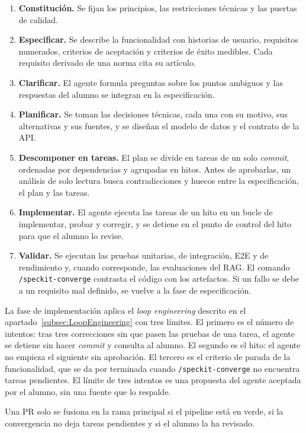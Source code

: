\begin{enumerate}
	\item \textbf{Constitución.} Se fijan los principios, las restricciones técnicas y las puertas de calidad.
	\item \textbf{Especificar.} Se describe la funcionalidad con historias de usuario, requisitos numerados, criterios de aceptación y criterios de éxito medibles. Cada requisito derivado de una norma cita su artículo.
	\item \textbf{Clarificar.} El agente formula preguntas sobre los puntos ambiguos y las respuestas del alumno se integran en la especificación.
	\item \textbf{Planificar.} Se toman las decisiones técnicas, cada una con su motivo, sus alternativas y sus fuentes, y se diseñan el modelo de datos y el contrato de la API.
	\item \textbf{Descomponer en tareas.} El plan se divide en tareas de un solo \emph{commit}, ordenadas por dependencias y agrupadas en hitos. Antes de aprobarlas, un análisis de solo lectura busca contradicciones y huecos entre la especificación, el plan y las tareas.
	\item \textbf{Implementar.} El agente ejecuta las tareas de un hito en un bucle de implementar, probar y corregir, y se detiene en el punto de control del hito para que el alumno lo revise.
	\item \textbf{Validar.} Se ejecutan las pruebas unitarias, de integración, E2E y de rendimiento y, cuando corresponde, las evaluaciones del RAG. El comando \texttt{/speckit-converge} contrasta el código con los artefactos. Si un fallo se debe a un requisito mal definido, se vuelve a la fase de especificación.
\end{enumerate}

La fase de implementación aplica el \emph{loop engineering} descrito en el apartado~\ref{subsec:LoopEngineering} con tres límites. El primero es el número de intentos: tras tres correcciones sin que pasen las pruebas de una tarea, el agente se detiene sin hacer \emph{commit} y consulta al alumno. El segundo es el hito: el agente no empieza el siguiente sin aprobación. El tercero es el criterio de parada de la funcionalidad, que se da por terminada cuando \texttt{/speckit-converge} no encuentra tareas pendientes. El límite de tres intentos es una propuesta del agente aceptada por el alumno, sin una fuente que lo respalde.

Una PR solo se fusiona en la rama principal si el pipeline está en verde, si la convergencia no deja tareas pendientes y si el alumno la ha revisado.

